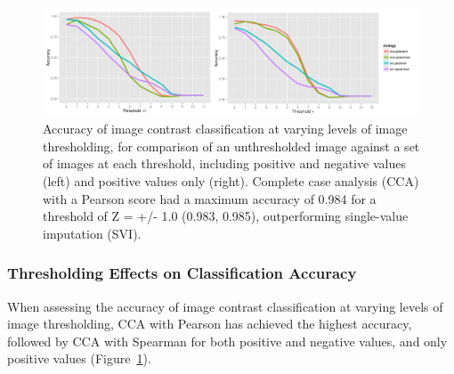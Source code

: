 \documentclass{report}
\begin{document}
\begin{figure}[ht!]
\begin{center}
\includegraphics[width=15cm]{images/figure23.png}
\end{center}
 \caption{\label{fig:23} Accuracy of image contrast classification at varying levels of image thresholding, for comparison of an unthresholded image against a set of images at each threshold, including positive and negative values (left) and positive values only (right). Complete case analysis (CCA) with a Pearson score had a maximum accuracy of 0.984 for a threshold of Z = +/- 1.0 (0.983, 0.985), outperforming single-value imputation (SVI).}
\end{figure}

\subsubsection{Thresholding Effects on Classification Accuracy}

When assessing the accuracy of image contrast classification at varying
levels of image thresholding, CCA with Pearson has achieved the highest
accuracy, followed by CCA with Spearman for both positive and negative
values, and only positive values (Figure~\ref{fig:23}).
\end{document}

